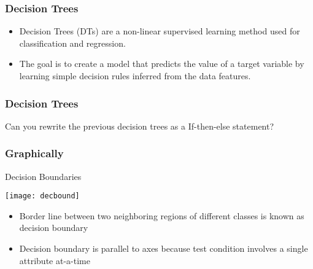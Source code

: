 
\begin{frame}[fragile]\frametitle{Decision Trees}
\begin{itemize}
	\item  Decision Trees (DTs) are a non-linear supervised learning method used for classification and regression. 
	\item The goal is to create a model that predicts the value of a target variable by learning simple decision rules inferred from the data features.
	\end{itemize}
\end{frame}

\begin{frame}[fragile]\frametitle{Decision Trees}
Can you rewrite the previous decision trees as a If-then-else statement?

\end{frame}

\begin{frame}[fragile]\frametitle{Graphically}
Decision Boundaries
\begin{center}
\texttt{[image: decbound]}
\end{center}
\begin{itemize}
	\item Border line between two neighboring regions of different classes is known as decision boundary
\item  Decision boundary is parallel to axes because test condition involves a single attribute at-a-time
	\end{itemize}
\end{frame}

